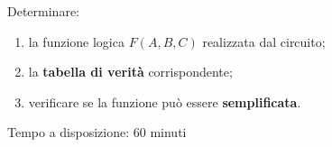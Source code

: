 \documentclass[a4paper,12pt]{article}
\begin{document}
	Determinare:
	
	\begin{enumerate}
		\item la funzione logica \(F(A,B,C)\) realizzata dal circuito;
		\item la \textbf{tabella di verità} corrispondente;
		\item verificare se la funzione può essere \textbf{semplificata}.
	\end{enumerate}
	
	\vspace{1cm}
	
	Tempo a disposizione: 60 minuti
	
\end{document}
